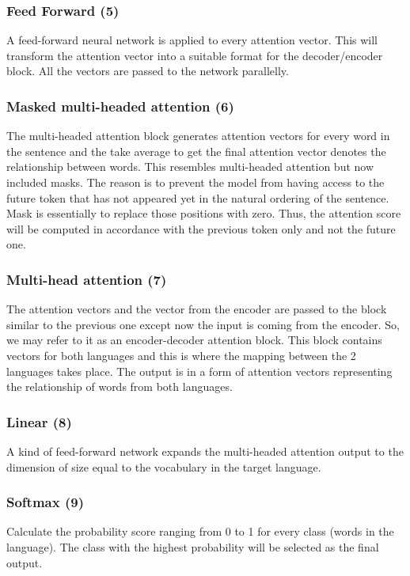 \documentclass[12pt,oneside,openright,a4paper]{cpe-english-project}
\begin{document}
\subsubsection{Feed Forward (5)}
A feed-forward neural network is applied to every attention vector. This will transform the attention vector into a suitable format for the decoder/encoder block. All the vectors are passed to the network parallelly.

\subsubsection{Masked multi-headed attention (6)}
The multi-headed attention block generates attention vectors for every word in the sentence and the take average to get the final attention vector denotes the relationship between words. This resembles multi-headed attention but now included masks.
The reason is to prevent the model from having access to the future token that has not appeared yet in the natural ordering of the sentence. Mask is essentially to replace those positions with zero. Thus, the attention score will be computed in accordance with the previous token only and not the future one. 

\subsubsection{Multi-head attention (7)}
The attention vectors and the vector from the encoder are passed to the block similar to the previous one except now the input is coming from the encoder. So, we may refer to it as an encoder-decoder attention block. This block contains vectors for both languages and this is where the mapping between the 2 languages takes place. The output is in a form of attention vectors representing the relationship of words from both languages. 

\subsubsection{Linear (8)}
A kind of feed-forward network expands the multi-headed attention output to the dimension of size equal to the vocabulary in the target language. 

\subsubsection{Softmax (9)}
Calculate the probability score ranging from 0 to 1 for every class (words in the language). The class with the highest probability will be selected as the final output.
\end{document}
